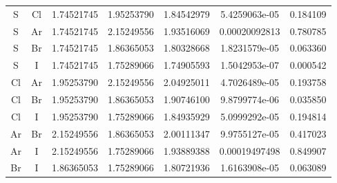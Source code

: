 \begin{longtable}{@{}ccccccc@{}}
S  &  Cl    &     1.74521745   &   1.95253790  &    1.84542979 &  5.4259063e-05  &  0.184109\\
S  &  Ar    &     1.74521745   &   2.15249556  &    1.93516069 &  0.00020092813  &  0.780785\\
S  &  Br    &     1.74521745   &   1.86365053  &    1.80328668 &  1.8231579e-05  &  0.063360\\
S  &  I     &     1.74521745   &   1.75289066  &    1.74905593 &  1.5042953e-07  &  0.000542\\
Cl &  Ar    &     1.95253790   &   2.15249556  &    2.04925011 &  4.7026489e-05  &  0.193758\\
Cl &  Br    &     1.95253790   &   1.86365053  &    1.90746100 &  9.8799774e-06  &  0.035850\\
Cl &  I     &     1.95253790   &   1.75289066  &    1.84935929 &  5.0999292e-05  &  0.194814\\
Ar &  Br    &     2.15249556   &   1.86365053  &    2.00111347 &  9.9755127e-05  &  0.417023\\
Ar &  I     &     2.15249556   &   1.75289066  &    1.93889388 &  0.00019497498  &  0.849907\\
Br &  I     &     1.86365053   &   1.75289066  &    1.80721936 &  1.6163908e-05  &  0.063089\\
\end{longtable}
